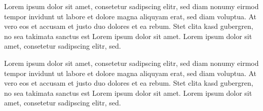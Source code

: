 \documentclass{memoir}
\begin{document}
\lipsum

\noindent\dotfill\par

\begingroup
\obeylines
\obeyspaces
Lorem     ipsum dolor sit amet, consetetur sadipscing elitr, 
sed diam nonumy eirmod tempor invidunt ut labore et dolore 
magna aliquyam erat, sed diam voluptua. At vero eos et accusam
et justo duo dolores et ea rebum. Stet clita kasd gubergren, 
no sea takimata sanctus est Lorem ipsum dolor sit amet. 
Lorem ipsum dolor sit amet, consetetur sadipscing elitr, sed.
	

Lorem ipsum dolor sit amet, consetetur sadipscing elitr, 
sed diam nonumy eirmod tempor invidunt ut labore et dolore 
magna aliquyam erat, sed diam voluptua. At vero eos et accusam
et justo duo dolores et ea rebum. Stet clita kasd gubergren, 
no sea takimata sanctus est Lorem ipsum dolor sit amet. 
Lorem ipsum dolor sit amet, consetetur sadipscing elitr, sed.
\endgroup



\end{document}
